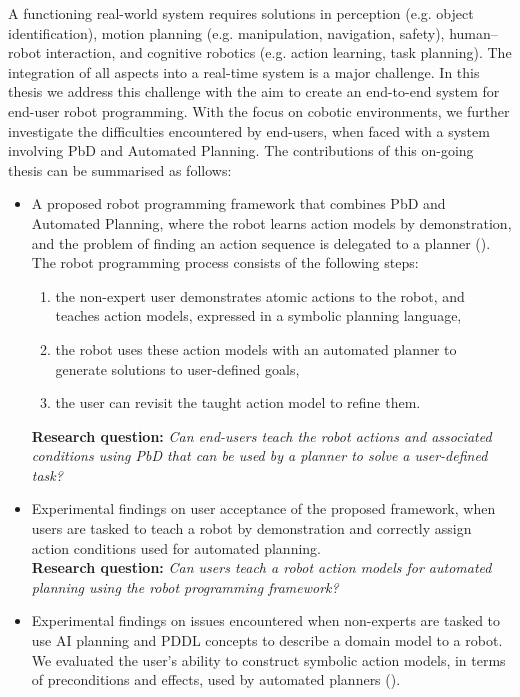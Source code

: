 A functioning real-world system requires solutions in perception (e.g. object identification), motion planning (e.g. manipulation, navigation, safety), human–robot interaction, and cognitive robotics (e.g. action learning, task planning). 
The integration of all aspects into a real-time system is a major challenge.
In this thesis we address this challenge with the aim to create an end-to-end system for end-user robot programming.
With the focus on cobotic environments, we further investigate the difficulties encountered by end-users, when faced with a system involving PbD and Automated Planning. 
The contributions of this on-going thesis can be summarised as follows:
\begin{itemize}
	\item {A proposed robot programming framework that combines PbD and Automated Planning, where the robot learns action models by demonstration, and the problem of finding an action sequence is delegated to a planner (\cite{liang2017framework}).
	The robot programming process consists of the following steps:
	\begin{enumerate}
		\item the non-expert user demonstrates atomic actions to the robot, and teaches {action models}, expressed in a symbolic planning language,
		\item the robot uses these action models with an automated planner to generate solutions to user-defined goals,
		\item the user can revisit the taught action model to refine them.
	\end{enumerate}
	\textbf{Research question:} \textit{Can end-users teach the robot actions and associated conditions using PbD that can be used by a planner to solve a user-defined task?}}
    \item {Experimental findings on user acceptance of the proposed framework, when users are tasked to teach a robot by demonstration and correctly assign action conditions used for automated planning.\\
    \textbf{Research question:} \textit{Can users teach a robot action models for automated planning using the robot programming framework?}}
    \item {Experimental findings on issues encountered when non-experts are tasked to use AI planning and PDDL concepts to describe a domain model to a robot. 
    We evaluated the user's ability to construct symbolic action models, in terms of preconditions and effects, used by automated planners (\cite{liang2017evaluation}).\\
}
\end{itemize}

